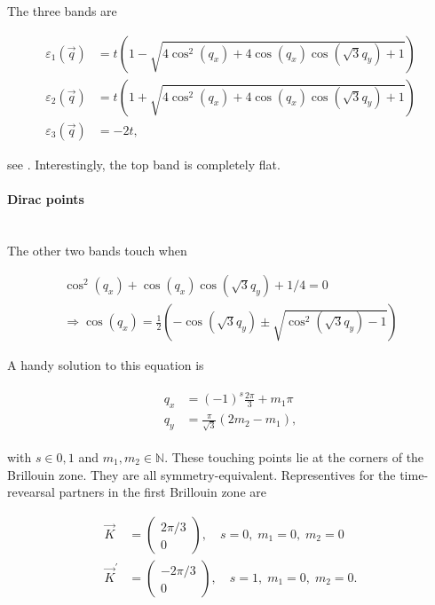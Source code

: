 \documentclass[../../../main.tex]{subfiles}
\begin{document}
The three bands are 

\begin{align}
	\varepsilon_1(\vec{q}) &= t\left(1-\sqrt{4\cos^2(q_x)+4\cos(q_x) \cos(\sqrt{3}q_y)+1}\right) \\
	\varepsilon_2(\vec{q}) &= t\left(1+\sqrt{4\cos^2(q_x)+4\cos(q_x) \cos(\sqrt{3}q_y)+1}\right) \\
	\varepsilon_3(\vec{q}) &= -2t,
\end{align}

see \cite{DiSante2026}. Interestingly, the top band is completely flat. 

\paragraph{Dirac points} \hfill \\

The other two bands touch when

\begin{gather}
	\cos^2(q_x) + \cos(q_x)\cos(\sqrt{3}q_y) + 1/4 = 0 \\
	\Rightarrow \cos(q_x) = \frac12\left(-\cos(\sqrt{3}q_y) \pm \sqrt{\cos^2(\sqrt{3}q_y)-1}\right)
\end{gather}

A handy solution to this equation is 

\begin{align}
	\begin{split}
		q_x &= (-1)^s\frac{2\pi}{3} + m_1\pi \\
		q_y &= \frac{\pi}{\sqrt{3}}\left(2m_2-m_1\right),
	\end{split}
\end{align}

with $s \in {0,1}$ and $m_1, m_2 \in \mathbb{N}$. These touching points lie at the corners of the Brillouin zone. They are all symmetry-equivalent. Representives for the time-revearsal partners in the first Brillouin zone are 

\begin{align}
	\vec{K} &= 
	\begin{pmatrix}
		2\pi/3 \\
		0
	\end{pmatrix}, \quad s=0, \; m_1 = 0, \; m_2 = 0 \\
	\vec{K}^\prime &= 
	\begin{pmatrix}
		-2\pi/3 \\
		0
	\end{pmatrix}, \quad s = 1, \; m_1 = 0, \; m_2 = 0.
\end{align}
\end{document}
